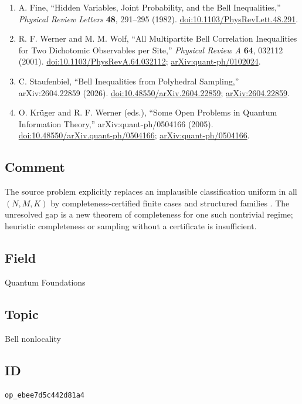 \begin{enumerate}[label={},leftmargin=4.8em,labelsep=0.5em]
  \footnotesize
  \item[\textup{[Fin82]}]\label{ref:p11-fine}
  A. Fine,
  ``Hidden Variables, Joint Probability, and the Bell Inequalities,''
  \emph{Physical Review Letters} \textbf{48}, 291--295 (1982).
  \href{https://doi.org/10.1103/PhysRevLett.48.291}{doi:10.1103/PhysRevLett.48.291}.

  \item[\textup{[WW01]}]\label{ref:p11-werner-wolf}
  R. F. Werner and M. M. Wolf,
  ``All Multipartite Bell Correlation Inequalities for Two Dichotomic
  Observables per Site,''
  \emph{Physical Review A} \textbf{64}, 032112 (2001).
  \href{https://doi.org/10.1103/PhysRevA.64.032112}{doi:10.1103/PhysRevA.64.032112};
  \href{https://arxiv.org/abs/quant-ph/0102024}{arXiv:quant-ph/0102024}.

  \item[\textup{[Sta26]}]\label{ref:p11-staufenbiel}
  C. Staufenbiel,
  ``Bell Inequalities from Polyhedral Sampling,'' arXiv:2604.22859 (2026).\newline
  \href{https://doi.org/10.48550/arXiv.2604.22859}{doi:10.48550/arXiv.2604.22859};
  \href{https://arxiv.org/abs/2604.22859}{arXiv:2604.22859}.

  \item[\textup{[KW05]}]\label{ref:p11-krueger-werner}
  O. Krüger and R. F. Werner (eds.),
  ``Some Open Problems in Quantum Information Theory,''
  arXiv:quant-ph/0504166 (2005).
  \href{https://doi.org/10.48550/arXiv.quant-ph/0504166}{doi:10.48550/arXiv.quant-ph/0504166};
  \href{https://arxiv.org/abs/quant-ph/0504166}{arXiv:quant-ph/0504166}.
\end{enumerate}

\subsection*{Comment}

The source problem explicitly replaces an implausible classification uniform
in all $(N,M,K)$ by completeness-certified finite cases and structured
families .  The unresolved gap is a
new theorem of completeness for one such nontrivial regime; heuristic
completeness or sampling without a certificate is insufficient.

\subsection*{Field}

Quantum Foundations

\subsection*{Topic}

Bell nonlocality

\subsection*{ID}

\texttt{op\_ebee7d5c442d81a4}
